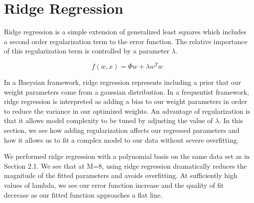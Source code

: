 \documentclass[10pt]{article}
\begin{document}
%

\section{Ridge Regression}

Ridge regression is a simple extension of generalized least squares which includes a second order regularization term to the error function. The relative importance of this regularization term is controlled by a parameter $\lambda$. 

$$f(w,x) = \Phi w + \lambda w^Tw$$

In a Baeysian framework, ridge regression represents including a prior that our weight parameters come from a gaussian distribution. In a frequentist framework, ridge regression is interpreted as adding a bias to our weight parameters in order to reduce the variance in our optimized weights. An advantage of regularization is that it allows model complexity to be tuned by adjusting the value of $\lambda$. In this section, we see how adding regularization affects our regressed parameters and how it allows us to fit a complex model to our data without severe overfitting.

We performed ridge regression with a polynomial basis on the same data set as in Section 2.1. We see that at M=8, using ridge regression dramatically reduces the magnitude of the fitted parameters and avoids overfitting. At sufficiently high values of lambda, we see our error function increase and the quality of fit decrease as our fitted function approaches a flat line.
\end{document}
